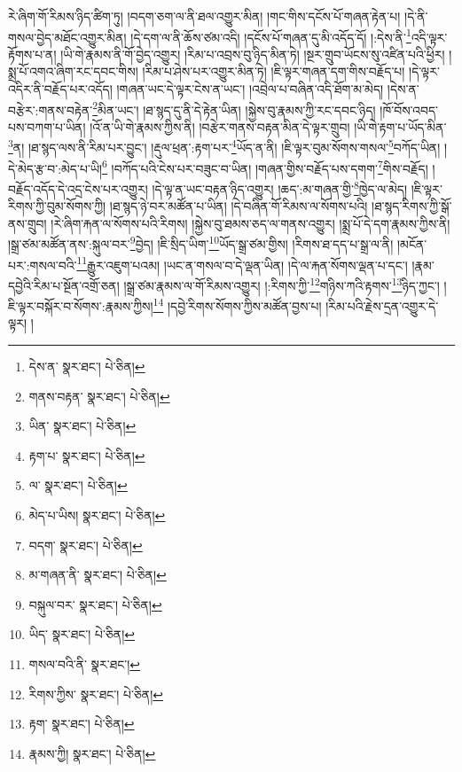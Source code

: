 རེ་ཞིག་གོ་རིམས་ཉིད་ཚིག་ཏུ། །བདག་ཅག་ལ་ནི་ཐལ་འགྱུར་མིན། །གང་གིས་དངོས་པོ་གཞན་རྟེན་པ། །དེ་ནི་གསལ་བྱེད་མཐོང་འགྱུར་མིན། །དེ་དག་ལ་ནི་ཆོས་ཙམ་འདི། །དངོས་པོ་གཞན་དུ་མི་འདོད་དོ། །:དེས་ནི་\footnote{དེས་ན་  སྣར་ཐང་།  པེ་ཅིན། }འདི་ལྟར་རྟོགས་པ་ན། །ཡི་གེ་རྣམས་ནི་གོ་བྱེད་འགྱུར། །རིམ་པ་འབྲས་བུ་ཉིད་མིན་ཏེ། །སྔར་གྲུབ་ཡོངས་སུ་འཛིན་པའི་ཕྱིར། །སྨྲ་པོ་འགའ་ཞིག་རང་དབང་གིས། །རིམ་པ་ཤེས་པར་འགྱུར་མིན་ཏེ། །ཇི་ལྟར་གཞན་དག་གིས་བརྗོད་པ། །དེ་ལྟར་འདིར་ནི་བརྗོད་པར་འདོད། །གཞན་ཡང་དེ་ལྟར་ངེས་ན་ཡང་། །འབྲེལ་པ་བཞིན་འདི་ཐོག་མ་མེད། །དེས་ན་བརྩེར་:གནས་བརྟེན་\footnote{གནས་བརྟན་  སྣར་ཐང་།  པེ་ཅིན། }མིན་ཡང་། །ཐ་སྙད་དུ་ནི་དེ་རྟེན་ཡིན། །སྐྱེས་བུ་རྣམས་ཀྱི་རང་དབང་ཉིད། །ཁོ་བོས་འབད་པས་བཀག་པ་ཡིན། །འོ་ན་ཡི་གེ་རྣམས་ཀྱིས་ནི། །བརྩེར་གནས་བརྟན་མིན་དེ་ལྟར་གྲུབ། །ཡི་གེ་རྟག་པ་ཡོད་མིན་\footnote{ཡིན་  སྣར་ཐང་།  པེ་ཅིན། }ན། །ཐ་སྙད་ལས་ནི་རིམ་པར་བྱུང་། །རྡུལ་ཕྲན་:རྟག་པར་\footnote{རྟག་པ་  སྣར་ཐང་།  པེ་ཅིན། }ཡོད་ན་ནི། །ཇི་ལྟར་བུམ་སོགས་གསལ་\footnote{ལ་  སྣར་ཐང་།  པེ་ཅིན། }བཀོད་ཡིན། །དེ་མེད་རྩ་བ་:མེད་པ་ཡི།\footnote{མེད་པ་ཡིས།  སྣར་ཐང་།  པེ་ཅིན། } །བཀོད་པའི་ངེས་པར་བཟུང་བ་ཡིན། །གཞན་གྱིས་བརྗོད་པས་དགག་\footnote{བདག་  སྣར་ཐང་།  པེ་ཅིན། }གིས་བརྗོད། །བརྗོད་འདོད་དེ་འདྲ་ངེས་པར་འགྱུར། །དེ་ལྟ་ན་ཡང་བརྟན་ཉིད་འགྱུར། །ཆད་:མ་གཞན་གྱི་\footnote{མ་གཞན་ནི་  སྣར་ཐང་།  པེ་ཅིན། }ཁྱེད་ལ་མེད། །ཇི་ལྟར་རིགས་ཀྱི་བུམ་སོགས་ཀྱི། །ཐ་སྙད་ཉེ་བར་མཚོན་པ་ཡིན། །དེ་བཞིན་གོ་རིམས་ལ་སོགས་པའི། །ཐ་སྙད་རིགས་ཀྱི་སྒོ་ནས་གྲུབ། །རེ་ཞིག་རྐན་ལ་སོགས་པའི་རིགས། །སྐྱེས་བུ་ཐམས་ཅད་ལ་གནས་འགྱུར། །སྨྲ་པོ་དེ་དག་རྣམས་ཀྱིས་ནི། །སྒྲ་ཙམ་མཚོན་ནས་:སྐུལ་བར་\footnote{བསྐུལ་བར་  སྣར་ཐང་།  པེ་ཅིན། }བྱེད། །ཇི་སྲིད་ཡིག་\footnote{ཡིད་  སྣར་ཐང་།  པེ་ཅིན། }ཡོད་སྒྲ་ཙམ་གྱིས། །རིགས་ཐ་དད་པ་སྒྲ་ལ་ནི། །མངོན་པར་:གསལ་བའི་\footnote{གསལ་བའི་ནི་  སྣར་ཐང་། }རྒྱུར་འཇུག་པའམ། །ཡང་ན་གསལ་བ་དེ་ལྡན་ཡིན། །དེ་ལ་རྐན་སོགས་ལྡན་པ་དང་། །རྣམ་དབྱེའི་རིམ་པ་སྔོན་འགྲོ་ཅན། །སྒྲ་ཙམ་རྣམས་ལ་གོ་རིམས་འགྱུར། །:རིགས་ཀྱི་\footnote{རིགས་ཀྱིས་  སྣར་ཐང་།  པེ་ཅིན། }གཉིས་ཀའི་རྟགས་\footnote{རྟག་  སྣར་ཐང་།  པེ་ཅིན། }ཉིད་ཀྱང་། །ཇི་ལྟར་བསྐོར་བ་སོགས་:རྣམས་ཀྱིས།\footnote{རྣམས་ཀྱི།  སྣར་ཐང་།  པེ་ཅིན། } །དབྱེ་རིགས་སོགས་ཀྱིས་མཚོན་བྱས་པ། །རིམ་པའི་རྗེས་དྲན་འགྱུར་དེ་ལྟར། །
